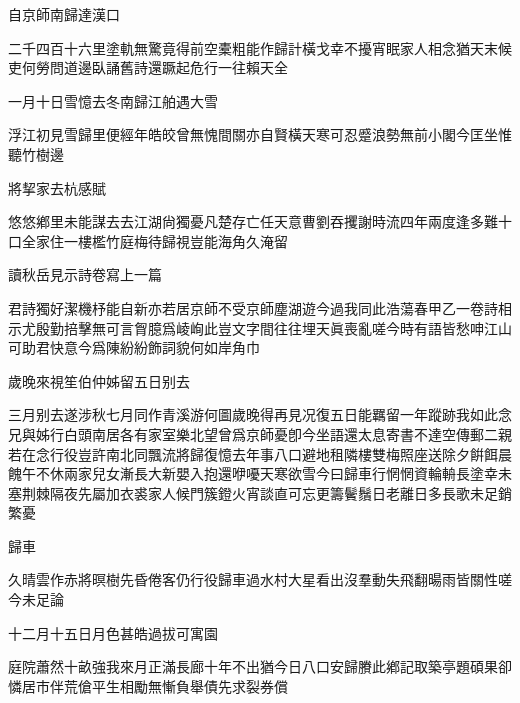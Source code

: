 \documentclass{zhvt-classic-Miya}
\begin{document}
\begin{fw}自京師南歸達漢口\end{fw}

二千四百十六里塗軌無驚竟得前空橐粗能作歸計橫戈幸不擾宵眠家人相念猶天末候吏何勞問道邊臥誦舊詩還蹶起危行一往賴天全

\begin{fw}一月十日雪憶去冬南歸江舶遇大雪\end{fw}

浮江初見雪歸里便經年皓皎曾無愧間關亦自賢橫天寒可忍蹙浪勢無前小閣今匡坐惟聽竹樹邊

\begin{fw}將挈家去杭感賦\end{fw}

悠悠鄕里未能謀去去江湖尙獨憂凡楚存亡任天意曹劉吞攫謝時流四年兩度逢多難十口全家住一樓檻竹庭梅待歸視豈能海角久淹留

\begin{fw}讀秋岳見示詩卷寫上一篇\end{fw}

君詩獨好潔機杼能自新亦若居京師不受京師塵湖遊今過我同此浩蕩春甲乙一卷詩相示尤殷勤掊擊無可言胷臆爲崚峋此豈文字間往往埋天眞喪亂嗟今時有語皆愁呻江山可助君快意今爲陳紛紛飾詞貌何如岸角巾

\begin{fw}歲晚來視笙伯仲姊留五日别去\end{fw}

三月别去遂涉秋七月同作青溪游何圖歲晚得再見况復五日能羈留一年蹤跡我如此念兄與姊行白頭南居各有家室樂北望曾爲京師憂卽今坐語還太息寄書不達空傳郵二親若在念行役豈許南北同飄流將歸復憶去年事八口避地租隣樓雙梅照座送除夕餠餌晨餽午不休兩家兒女漸長大新嬰入抱還咿嚘天寒欲雪今曰歸車行惘惘資輪輈長塗幸未塞荆棘隔夜先屬加衣裘家人候門簇鐙火宵談直可忘更籌鬢鬚日老離日多長歌未足銷繁憂

\begin{fw}歸車\end{fw}

久晴雲作赤將暝樹先昏倦客仍行役歸車過水村大星看出沒羣動失飛翻暘雨皆關性嗟今未足論

\begin{fw}十二月十五日月色甚皓過拔可寓園\end{fw}

庭院蕭然十畝強我來月正滿長廊十年不出猶今日八口安歸賸此鄕記取築亭題碩果卻憐居市伴荒傖平生相勵無慚負舉債先求裂券償
\end{document}
